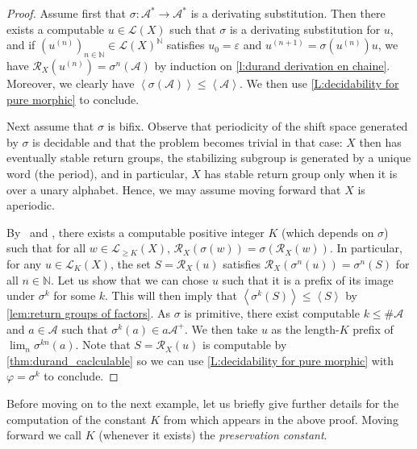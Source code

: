 \documentclass{amsart}
\newcommand*{\N}{\mathbb{N}}
\newcommand*{\nn}{\mathbb{N}}
\newcommand*{\ret}{\mathcal{R}}
\newcommand*{\lang}{\mathcal{L}}
\newcommand*{\cA}{\mathcal{A}}
\newcommand*{\from}{\colon}
\newcommand*{\card}{\#}
\newcommand*{\gen}[1]{\left\langle #1\right\rangle}
\theoremstyle{plain}
\theoremstyle{definition}
\theoremstyle{remark}
\begin{document}
\begin{proof}
    Assume first that $\sigma\from \cA^* \to \cA^*$ is a derivating substitution. Then there exists a computable $u \in \lang(X)$ such that $\sigma$ is a derivating substitution for $u$, and if $(u^{(n)})_{n\in \N} \in \lang(X)^\N$ satisfies $u_0 = \varepsilon$ and $u^{(n+1)} = \sigma(u^{(n)})u$, we have $\ret_X(u^{(n)}) = \sigma^n(\cA)$ by induction on \cref{l:durand derivation en chaine}. Moreover, we clearly have $\gen{\sigma(\cA)} \leq \gen{\cA}$. We then use \cref{L:decidability for pure morphic} to conclude.

    Next assume that $\sigma$ is bifix. Observe that periodicity of the shift space generated by $\sigma$ is decidable \cite{Pansiot1986,Harju1986} and that the problem becomes trivial in that case: $X$ then has eventually stable return groups, the stabilizing subgroup is generated by a unique word (the period), and in particular, $X$ has stable return group only when it is over a unary alphabet. Hence, we may assume moving forward that $X$ is aperiodic.
    
    By~\cite[Theorem 1]{Berthe2023} and \cite[Proposition 3]{Berthe2023}, there exists a computable positive integer $K$ (which depends on $\sigma$) such that for all $w \in \lang_{\geq K}(X)$, $\ret_X(\sigma(w)) = \sigma(\ret_X(w))$. In particular, for any $u \in \lang_K(X)$, the set $S = \ret_X(u)$ satisfies $\ret_X(\sigma^n(u)) = \sigma^n(S)$ for all $n\in\nn$. Let us show that we can chose $u$ such that it is a prefix of its image under $\sigma^k$ for some $k$. This will then imply that $\gen{\sigma^k(S)} \leq \gen{S}$ by \cref{lem:return groups of factors}. As $\sigma$ is primitive, there exist computable $k \leq \card\cA$ and $a \in \cA$ such that $\sigma^k(a) \in a\cA^+$. We then take $u$ as the length-$K$ prefix of $\lim_n \sigma^{kn}(a)$. Note that $S = \ret_X(u)$ is computable by \cref{thm:durand_caclculable} so we can use \cref{L:decidability for pure morphic} with $\varphi = \sigma^k$ to conclude.
\end{proof}

Before moving on to the next example, let us briefly give further details for the computation of the constant $K$ from \cite[Theorem~1]{Berthe2023} which appears in the above proof. Moving forward we call $K$ (whenever it exists) the \emph{preservation constant}.
\end{document}
